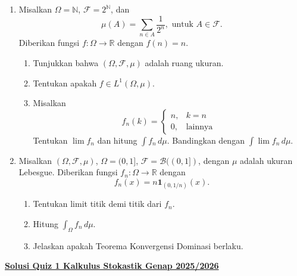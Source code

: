 \documentclass{article}
\begin{document}
\begin{enumerate}
  \item Misalkan $\Omega = \mathbb{N}$, $\mathcal{F} = 2^\mathbb{N}$, dan
        \[
          \mu(A) = \sum_{n \in A} \frac{1}{2^n}, \text{ untuk } A \in \mathcal{F}.
        \]
        Diberikan fungsi $f : \Omega \to \mathbb{R}$ dengan $f(n) = n$.
        \begin{enumerate}[label=(\alph*)]
          \item Tunjukkan bahwa $(\Omega, \mathcal{F}, \mu)$ adalah ruang ukuran.
          \item Tentukan apakah $f \in L^1(\Omega, \mu)$.
          \item Misalkan
                \[
                  f_n(k) = \begin{cases}
                    n, & k = n          \\
                    0, & \text{lainnya}
                  \end{cases}
                \]
                Tentukan $\lim f_n$ dan hitung $\int f_n \, d\mu$. Bandingkan dengan $\int \lim f_n \, d\mu$.
        \end{enumerate}

  \item Misalkan $(\Omega, \mathcal{F}, \mu)$, $\Omega = (0, 1]$, $\mathcal{F} = \mathcal{B}((0, 1])$, dengan $\mu$ adalah ukuran Lebesgue. Diberikan fungsi $f_n : \Omega \to \mathbb{R}$ dengan
        \[
          f_n(x) = n \mathbf{1}_{(0, 1/n)}(x).
        \]
        \begin{enumerate}[label=(\alph*)]
          \item Tentukan limit titik demi titik dari $f_n$.
          \item Hitung $\int_\Omega f_n \, d\mu$.
          \item Jelaskan apakah Teorema Konvergensi Dominasi berlaku.
        \end{enumerate}
\end{enumerate}
\newpage
\begin{center}
  \textbf{\underline{Solusi Quiz 1 Kalkulus Stokastik Genap 2025/2026}}
\end{center}
\end{document}
